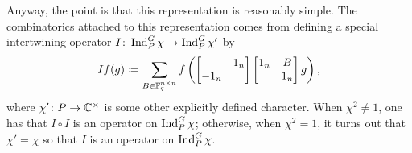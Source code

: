 \documentclass{amsart}
\begin{document}
Anyway, the point is that this representation is reasonably simple. The combinatorics attached to this representation comes from defining a special intertwining operator $I\colon\operatorname{Ind}_P^G\chi\to\operatorname{Ind}_P^G\chi'$ by
\[If(g)\coloneqq\sum_{B\in\mathbb F_q^{n\times n}}f\left(\begin{bmatrix}
    & 1_n \\ -1_n
\end{bmatrix}\begin{bmatrix}
    1_n & B \\ & 1_n
\end{bmatrix}g\right),\]
where $\chi'\colon P\to\mathbb C^\times$ is some other explicitly defined character. When $\chi^2\ne1$, one has that $I\circ I$ is an operator on $\operatorname{Ind}_P^G\chi$; otherwise, when $\chi^2=1$, it turns out that $\chi'=\chi$ so that $I$ is an operator on $\operatorname{Ind}_P^G\chi$.
\end{document}
